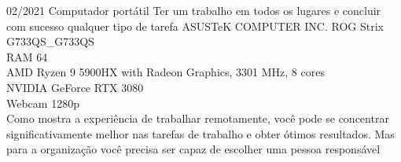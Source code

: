 

\begin{entrylist}
    \entry
    {02/2021}
    {Computador portátil}
    {Ter um trabalho em todos os lugares e concluir com sucesso qualquer tipo de tarefa}
    {
        ASUSTeK COMPUTER INC. ROG Strix G733QS\_G733QS             \\
        RAM 64                                                     \\
        AMD Ryzen 9 5900HX with Radeon Graphics, 3301 MHz, 8 cores \\
    NVIDIA GeForce RTX 3080                                    \\
    Webcam 1280p\\

    Como mostra a experiência de trabalhar remotamente, você pode se concentrar significativamente melhor nas tarefas de trabalho e obter ótimos resultados.
    Mas para a organização você precisa ser capaz de escolher uma pessoa responsável
    }
\end{entrylist}
